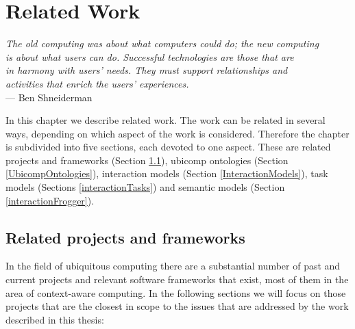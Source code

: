 \chapter{Related Work}

\begin{flushright}{\slshape
The old computing was about what computers could do; the new computing \\
is about what users can do. Successful technologies are those that are\\
in harmony with users' needs. They must support relationships and \\
activities that enrich the users' experiences. } \\ \medskip
	    --- Ben Shneiderman
	\end{flushright}

In this chapter we describe related work. The work can be related in several ways, depending on which aspect of the work is considered. Therefore the chapter is subdivided into five sections, each devoted to one aspect. These are related projects and frameworks (Section \ref{RelatedProjects}), ubicomp ontologies (Section \ref{UbicompOntologies}), interaction models (Section \ref{InteractionModels}), task models (Sections \ref{interactionTasks}) and semantic models (Section \ref{interactionFrogger}).






\section{Related projects and frameworks}
\label{RelatedProjects}
% 
% 

In the field of ubiquitous computing there are a substantial number of past and current projects and relevant software frameworks that exist, most of them in the area of context-aware computing. In the following sections we will focus on those projects that are the closest in scope to the issues that are addressed by the work described in this thesis:

